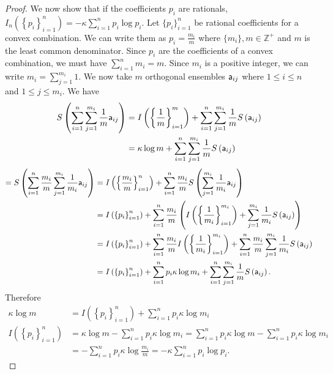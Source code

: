 \begin{proof}
	We now show that if the coefficients $p_i$ are rationals, $I_n\left(\left\{ p_i\right\}_{i=1}^{n}\right) = - \kappa \sum_{i=1}^{n} p_i \log p_i$. Let $\{p_i\}_{i=1}^{n}$ be rational coefficients for a convex combination. We can write them as $p_i = \frac{m_i}{m}$ where $\{m_i\}, m \in \mathbb{Z}^+$ and $m$ is the least common denominator. Since $p_i$ are the coefficients of a convex combination, we must have $\sum_{i=1}^{n} m_i = m$. Since $m_i$ is a positive integer, we can write $m_i = \sum_{j=1}^{m_i} 1$. We now take $m$ orthogonal ensembles $\ens[a]_{ij}$ where $1 \leq i \leq n$ and $1 \leq j \leq m_i$. We have
	\begin{equation}
		\begin{aligned}
			S\left(\sum_{i=1}^{n}\sum_{j=1}^{m_i} \frac{1}{m} \ens[a]_{ij}\right) &= I\left(\left\{ \frac{1}{m}\right\}_{i=1}^{m}\right) + \sum_{i=1}^{n}\sum_{j=1}^{m_i} \frac{1}{m} S\left(\ens[a]_{ij}\right) \\
			&= \kappa \log m + \sum_{i=1}^{n}\sum_{j=1}^{m_i} \frac{1}{m} S\left(\ens[a]_{ij}\right) \\
		\end{aligned}
	\end{equation}
	\begin{equation}
		\begin{aligned}
			= S\left(\sum_{i=1}^{n} \frac{m_i}{m} \sum_{j=1}^{m_i} \frac{1}{m_i} \ens[a]_{ij}\right)  &=I\left(\left\{ \frac{m_i}{m}\right\}_{i=1}^{n}\right) + \sum_{i=1}^{n} \frac{m_i}{m}  S\left(\sum_{j=1}^{m_i} \frac{1}{m_i} \ens[a]_{ij}\right) \\
			&=I\left(\left\{ p_i\right\}_{i=1}^{n}\right) + \sum_{i=1}^{n} \frac{m_i}{m}\left(I\left(\left\{ \frac{1}{m_i}\right\}_{i=1}^{m_i}\right) + \sum_{j=1}^{m_i} \frac{1}{m_i} S\left(\ens[a]_{ij}\right)\right) \\
			&=I\left(\left\{ p_i\right\}_{i=1}^{n}\right) + \sum_{i=1}^{n} \frac{m_i}{m} I\left(\left\{ \frac{1}{m_i}\right\}_{i=1}^{m_i}\right) + \sum_{i=1}^{n} \frac{m_i}{m} \sum_{j=1}^{m_i} \frac{1}{m_i}S\left(\ens[a]_{ij}\right) \\
			&=I\left(\left\{ p_i\right\}_{i=1}^{n}\right) + \sum_{i=1}^{n} p_i \kappa \log m_i + \sum_{i=1}^{n}  \sum_{j=1}^{m_i} \frac{1}{m} S\left(\ens[a]_{ij}\right).
		\end{aligned}
	\end{equation}
	Therefore
	\begin{equation}
		\begin{aligned}
			\kappa \log m &= I\left(\left\{ p_i\right\}_{i=1}^{n}\right) + \sum_{i=1}^{n} p_i \kappa \log m_i \\
			I\left(\left\{ p_i\right\}_{i=1}^{n}\right) &= \kappa \log m - \sum_{i=1}^{n} p_i \kappa \log m_i = \sum_{i=1}^{n} p_i \kappa \log m - \sum_{i=1}^{n} p_i \kappa \log m_i \\
			&= - \sum_{i=1}^{n} p_i \kappa \log \frac{m_i}{m} = - \kappa \sum_{i=1}^{n} p_i \log p_i.
		\end{aligned}
	\end{equation}
	

\end{proof}
